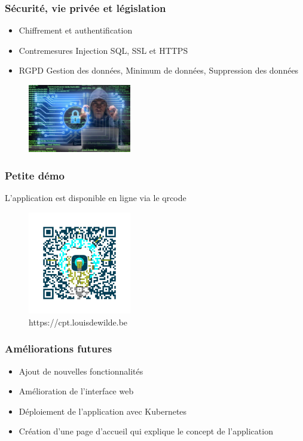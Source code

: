 \documentclass[aspectratio=169]{beamer}
\begin{document}
    \begin{frame}
        \frametitle{Sécurité, vie privée et législation}
        \begin{itemize}
            \item Chiffrement et authentification
            \item Contremesures
            \subitem Injection SQL,
            \subitem SSL et HTTPS
            \item RGPD
            \subitem Gestion des données,
            \subitem Minimum de données,
            \subitem Suppression des données
        \end{itemize}
        \begin{figure}[h]
            \centering
            \includegraphics[width=0.4\textwidth]{imgs/young-hacker-cyber-securty-concept-260nw-1450697288}\label{fig:figure5}
        \end{figure}

    \end{frame}

    \begin{frame}
        \frametitle{Petite démo}
        L'application est disponible en ligne via le qrcode
        \begin{figure}[h]
            \centering
            \includegraphics[width=0.4\textwidth]{imgs/QRcode_C3 (1)}\caption{https://cpt.louisdewilde.be}\label{fig:figure2}
        \end{figure}
    \end{frame}

    \begin{frame}
        \frametitle{Améliorations futures}
        \begin{itemize}
            \item Ajout de nouvelles fonctionnalités
            \item Amélioration de l'interface web
            \item Déploiement de l'application avec Kubernetes
            \item Création d'une page d'accueil qui explique le concept de l'application
        \end{itemize}
    \end{frame}
\end{document}

